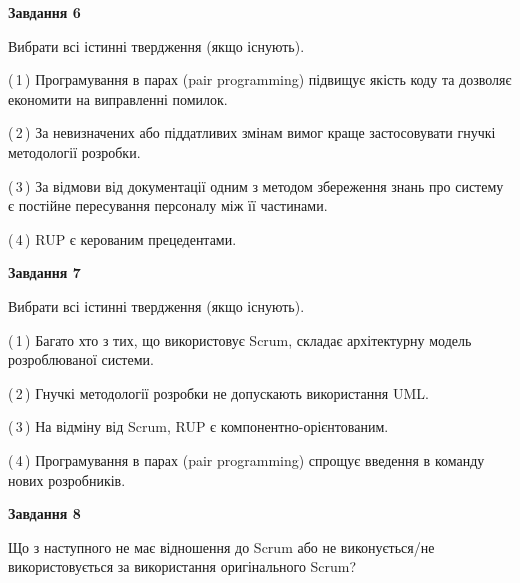 \documentclass[10pt, ukrainian]{article}
\begin{document}
{\begin {large}
\newpage

{\begin {center}\textbf{Завдання 6}\end {center}}\par
Вибрати всі істинні твердження (якщо існують).\par
\vspace{2mm}



(\,1\,) Програмування в парах (pair programming) підвищує якість коду та дозволяє економити на виправленні помилок. %



(\,2\,) За невизначених або піддатливих змінам вимог краще застосовувати гнучкі методології розробки. %



(\,3\,) За відмови від документації одним з методом збереження знань про систему є постійне пересування персоналу між її частинами. %



(\,4\,) RUP є керованим прецедентами. %


{\begin {center}\textbf{Завдання 7}\end {center}}\par
Вибрати всі істинні твердження (якщо існують).\par
\vspace{2mm}



(\,1\,) Багато хто з тих, що використовує Scrum, складає архітектурну модель розроблюваної системи. %



(\,2\,) Гнучкі методології розробки не допускають використання UML. %



(\,3\,) На відміну від Scrum, RUP є компонентно-орієнтованим. %



(\,4\,) Програмування в парах (pair programming) спрощує введення в команду нових розробників. %


{\begin {center}\textbf{Завдання 8}\end {center}}\par
Що з наступного не має відношення до Scrum або не виконується/не використовується за використання оригінального Scrum?\par
\vspace{2mm}




\end{large}}
\end{document}
